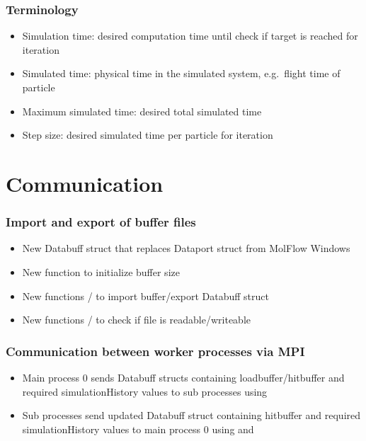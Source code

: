 \subsubsection{Terminology}
\begin{itemize}[noitemsep,topsep=0pt, partopsep=0pt]
\item Simulation time: desired computation time until check if target is reached for iteration
\item Simulated time: physical time in the simulated system, e.g.\ flight time of particle
\item Maximum simulated time: desired total simulated time
\item Step size: desired simulated time per particle for iteration
\end{itemize}

\section{Communication}
\subsubsection{Import and export of buffer files}
\begin{itemize}[noitemsep,topsep=0pt, partopsep=0pt]
\item New Databuff struct that replaces Dataport struct from MolFlow Windows
\end{itemize}
\begin{itemize}[noitemsep,topsep=0pt, partopsep=0pt]
\item New function  to initialize buffer size
\item New functions / to import buffer/export Databuff struct
\item New functions / to check if file is readable/writeable
\end{itemize}

\subsubsection{Communication between worker processes via MPI}
\begin{itemize}[noitemsep,topsep=0pt, partopsep=0pt]
\item Main process 0 sends Databuff structs containing loadbuffer/hitbuffer and required simulationHistory values to sub processes using 
\item Sub processes send updated Databuff struct containing hitbuffer and required simulationHistory values to main process 0 using  and 
\end{itemize}


